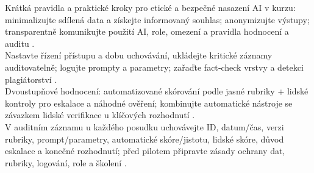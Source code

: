 \documentclass{report}%
\begin{document}
%
Krátká pravidla a praktické kroky pro etické a bezpečné nasazení AI v kurzu: minimalizujte sdílená data a získejte informovaný souhlas; anonymizujte výstupy; transparentně komunikujte použití AI, role, omezení a pravidla hodnocení a auditu \cite{4}.\\
Nastavte řízení přístupu a dobu uchovávání, ukládejte kritické záznamy auditovatelně; logujte prompty a parametry; zařaďte fact‑check vrstvy a detekci plagiátorství \cite{4, 3-3}.\\
Dvoustupňové hodnocení: automatizované skórování podle jasné rubriky + lidské kontroly pro eskalace a náhodné ověření; kombinujte automatické nástroje se závazkem lidské verifikace u klíčových rozhodnutí \cite{3-3, 4}.\\
V auditním záznamu u každého posudku uchovávejte ID, datum/čas, verzi rubriky, prompt/parametry, automatické skóre/jistotu, lidské skóre, důvod eskalace a konečné rozhodnutí; před pilotem připravte zásady ochrany dat, rubriky, logování, role a školení \cite{3-3, 4}.%

%
%
%
\end{document}
